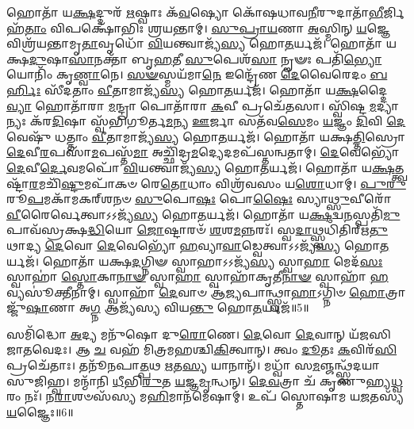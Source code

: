 𑌹𑍋𑌤𑌾᳴ 𑌯\-\ul{𑌕𑍍𑌷}\-𑌦𑍍𑌦𑍁𑌰᳴ \ul{𑌋}\-𑌷𑍍𑌵𑌾𑌃 𑌕᳴\-\ul{𑌵}\-𑌷𑍍𑌯𑍋 𑌕𑍋᳴𑌷𑌧𑌾𑌵\-\ul{𑌨𑍀}\-𑌰𑍁𑌦𑌾𑌤𑌾᳴\-\ul{𑌭𑍀}\-𑌰𑍍𑌜𑌿𑌹᳴\-\ul{𑌤𑌾𑌂} 𑌵𑌿𑌪𑌕𑍍𑌷𑍋᳴𑌭𑌿𑌃 𑌶𑍍𑌰𑌯𑌨𑍍𑌤𑌾𑌮𑍍।
\-\ul{𑌸𑍁}\-\-\ul{𑌪𑍍𑌰𑌾}\-\-\ul{𑌯}\-𑌣𑌾 \ul{𑌅}\-𑌸𑍍𑌮𑌿𑌨𑍍 \ul{𑌯}\-𑌜𑍍𑌞𑍇 𑌵𑌿𑌶𑍍𑌰᳴𑌯𑌨𑍍𑌤𑌾𑌮𑍃\-\ul{𑌤𑌾}\-𑌵𑍃𑌧𑍋᳴ \ul{𑌵𑌿}\-𑌯𑌨𑍍𑌤𑍍𑌵𑌾𑌜𑍍𑌯᳴\-\ul{𑌸𑍍𑌯} 𑌹𑍋\-\ul{𑌤}\-𑌰𑍍𑌯𑌜᳴।
𑌹𑍋𑌤𑌾᳴ 𑌯𑌕𑍍𑌷\-\ul{𑌦𑍁}\-𑌷𑌾\-\ul{𑌸𑌾}\-𑌨𑌕𑍍𑌤𑌾᳴ 𑌬𑍃\-\ul{𑌹}\-𑌤𑍀 \ul{𑌸𑍁}\-𑌪𑍇𑌶᳴\-\ul{𑌸𑌾} 𑌨𑍄𑍟𑌃 𑌪𑌤𑌿᳴\-\ul{𑌭𑍍𑌯𑍋} 𑌯𑍋𑌨𑌿𑌂᳴ 𑌕𑍃\-\ul{𑌣𑍍𑌵𑌾}\-𑌨𑍇।
\-\ul{𑌸}\-\-\ul{𑍟}\-𑌸𑍍𑌮𑌯᳴𑌮𑌾\-\ul{𑌨𑍇} 𑌇𑌨𑍍𑌦𑍍𑌰𑍇᳴𑌣 \ul{𑌦𑍇}\-𑌵𑍈𑌰𑍇𑌦𑌂 \ul{𑌬}\-\-\ul{𑌰𑍍}\-𑌹𑌿𑌃 𑌸𑍀᳴𑌦𑌤𑌾𑌂 \ul{𑌵𑍀}\-𑌤𑌾𑌮𑌾𑌜𑍍𑌯᳴\-\ul{𑌸𑍍𑌯} 𑌹𑍋\-\ul{𑌤}\-𑌰𑍍𑌯𑌜᳴।
𑌹𑍋𑌤𑌾᳴ 𑌯\-\ul{𑌕𑍍𑌷}\-𑌦𑍍𑌦𑍈\-\ul{𑌵𑍍𑌯𑌾} 𑌹𑍋𑌤𑌾᳴𑌰𑌾 \ul{𑌮}\-𑌨𑍍𑌦𑍍𑌰𑌾 𑌪𑍋𑌤𑌾᳴𑌰𑌾 \ul{𑌕}\-𑌵𑍀 𑌪𑍍𑌰𑌚𑍇᳴𑌤𑌸𑌾।
𑌸𑍍𑌵𑌿᳴𑌷𑍍𑌟\-\ul{𑌮}\-𑌦𑍍𑌯𑌾𑌨𑍍𑌯𑌃 𑌕᳴𑌰\-\ul{𑌦𑌿}\-𑌷𑌾 𑌸𑍍𑌵᳴𑌭𑌿𑌗𑍂𑌰𑍍𑌤\-\ul{𑌮}\-𑌨𑍍𑌯 \ul{𑌊}\-𑌰𑍍𑌜𑌾 𑌸𑌤᳴𑌵\-\ul{𑌸𑍇}\-𑌮𑌂 \ul{𑌯}\-𑌜𑍍𑌞𑌂 \ul{𑌦𑌿}\-𑌵𑌿 \ul{𑌦𑍇}\-𑌵𑍇𑌷𑍁᳴ 𑌧𑌤𑍍𑌤𑌾𑌂 \ul{𑌵𑍀}\-𑌤𑌾𑌮𑌾𑌜𑍍𑌯᳴\-\ul{𑌸𑍍𑌯} 𑌹𑍋\-\ul{𑌤}\-𑌰𑍍𑌯𑌜᳴।
𑌹𑍋𑌤𑌾᳴ 𑌯𑌕𑍍𑌷\-\ul{𑌤𑍍𑌤𑌿}\-𑌸𑍍𑌰𑍋 \ul{𑌦𑍇}\-𑌵𑍀\-\ul{𑌰}\-𑌪𑌸𑌾᳴\-\ul{𑌮}\-𑌪𑌸𑍍𑌤᳴\-\ul{𑌮𑌾} 𑌅𑌚𑍍𑌛𑌿᳴𑌦𑍍𑌰\-\ul{𑌮}\-𑌦𑍍𑌯𑍇𑌦𑌮𑌪᳴𑌸𑍍𑌤𑌨𑍍𑌵𑌤𑌾𑌮𑍍।
\-\ul{𑌦𑍇}\-𑌵𑍇𑌭𑍍𑌯𑍋᳴ \ul{𑌦𑍇}\-𑌵𑍀\-\ul{𑌰𑍍𑌦𑍇}\-𑌵𑌮𑌪𑍋᳴ \ul{𑌵𑌿}\-𑌯𑌨𑍍𑌤𑍍𑌵𑌾𑌜𑍍𑌯᳴\-\ul{𑌸𑍍𑌯} 𑌹𑍋\-\ul{𑌤}\-𑌰𑍍𑌯𑌜᳴।
𑌹𑍋𑌤𑌾᳴ 𑌯\-\ul{𑌕𑍍𑌷}\-𑌤𑍍𑌤𑍍𑌵𑌷𑍍𑌟𑌾᳴\-\ul{𑌰}\-𑌮𑌚𑌿᳴\-\ul{𑌷𑍍𑌟𑍁}\-𑌮𑌪𑌾᳴𑌕𑍞 𑌰𑍇\-\ul{𑌤𑍋}\-𑌧𑌾𑌂 𑌵𑌿𑌶𑍍𑌰᳴𑌵𑌸𑌂 𑌯\-\ul{𑌶𑍋}\-𑌧𑌾𑌮𑍍।
\-\ul{𑌪𑍁}\-\-\ul{𑌰𑍁}\-𑌰𑍂\-\ul{𑌪}\-𑌮𑌕𑌾᳴𑌮𑌕𑌰𑍍‌\mbox{}𑌶𑌨𑍞 \ul{𑌸𑍁}\-𑌪𑍋\-\ul{𑌷𑌃} 𑌪𑍋\-\ul{𑌷𑍈𑌃} 𑌸𑍍𑌯𑌾\-\ul{𑌥𑍍𑌸𑍁}\-𑌵𑍀𑌰𑍋᳴ \ul{𑌵𑍀}\-𑌰𑍈𑌰𑍍𑌵𑍇𑌤𑍍𑌵𑌾𑌽𑌽𑌜𑍍𑌯᳴\-\ul{𑌸𑍍𑌯} 𑌹𑍋\-\ul{𑌤}\-𑌰𑍍𑌯𑌜᳴।
𑌹𑍋𑌤𑌾᳴ 𑌯\-\ul{𑌕𑍍𑌷}\-𑌦𑍍𑌵\-\ul{𑌨}\-𑌸𑍍𑌪𑌤𑌿᳴\-\ul{𑌮𑍁}\-𑌪𑌾𑌵᳴𑌸𑍍𑌰𑌕𑍍𑌷\-\ul{𑌦𑍍𑌧𑌿}\-𑌯𑍋 \ul{𑌜𑍋}\-𑌷𑍍𑌟𑌾𑌰𑍞᳴ \ul{𑌶}\-𑌶\-\ul{𑌮}\-𑌨𑍍𑌨𑌰𑌃᳴।
𑌸𑍍𑌵\-\ul{𑌦𑌾}\-𑌥𑍍𑌸𑍍𑌵𑌧𑌿᳴𑌤𑌿𑌰𑍍\mbox{}𑌋\-\ul{𑌤𑍁}\-𑌥𑌾𑌦𑍍𑌯 \ul{𑌦𑍇}\-𑌵𑍋 \ul{𑌦𑍇}\-𑌵𑍇𑌭𑍍𑌯𑍋᳴ \ul{𑌹}\-𑌵𑍍𑌯𑌾\-\ul{𑌵𑌾}\-𑌡𑍍𑌵𑍇𑌤𑍍𑌵𑌾𑌽𑌽𑌜𑍍𑌯᳴\-\ul{𑌸𑍍𑌯} 𑌹𑍋\-\ul{𑌤}\-𑌰𑍍𑌯𑌜᳴।
𑌹𑍋𑌤𑌾᳴ 𑌯𑌕𑍍𑌷\-\ul{𑌦}\-𑌗𑍍𑌨𑌿𑍟 𑌸𑍍𑌵𑌾𑌹𑌾\-𑌽𑌽𑌜𑍍𑌯᳴\-\ul{𑌸𑍍𑌯} 𑌸𑍍𑌵𑌾\-\ul{𑌹𑌾} 𑌮𑍇𑌦᳴\-\ul{𑌸𑌃} 𑌸𑍍𑌵𑌾𑌹𑌾॑ \ul{𑌸𑍍𑌤𑍋}\-𑌕𑌾\-\ul{𑌨𑌾}\-\-\ul{𑍟} 𑌸𑍍𑌵𑌾\-\ul{𑌹𑌾} 𑌸𑍍𑌵𑌾𑌹𑌾᳴𑌕𑍃𑌤𑍀\-\ul{𑌨𑌾}\-\-\ul{𑍟} 𑌸𑍍𑌵𑌾𑌹𑌾᳴ \ul{𑌹}\-𑌵𑍍𑌯𑌸𑍂॑𑌕𑍍𑌤𑍀𑌨𑌾𑌮𑍍।
𑌸𑍍𑌵𑌾𑌹𑌾᳴ \ul{𑌦𑍇}\-𑌵𑌾𑍞 𑌆॑\-\ul{𑌜𑍍𑌯}\-𑌪𑌾𑌨𑍍𑌥𑍍𑌸𑍍𑌵𑌾\-\ul{𑌹𑌾}\-\-𑌽𑌗𑍍𑌨𑌿𑍞 \ul{𑌹𑍋}\-𑌤𑍍𑌰𑌾𑌜𑍍𑌜𑍁᳴\-\ul{𑌷𑌾}\-𑌣𑌾 𑌅\-\ul{𑌗𑍍𑌨} 𑌆𑌜𑍍𑌯᳴𑌸𑍍𑌯 𑌵𑌿𑌯\-\ul{𑌨𑍍𑌤𑍁} 𑌹𑍋\-\ul{𑌤}\-𑌰𑍍𑌯𑌜᳴॥5॥

𑌸𑌮𑌿᳴𑌦𑍍𑌧𑍋 \ul{𑌅}\-𑌦𑍍𑌯 𑌮𑌨𑍁᳴𑌷𑍋 𑌦𑍁\-\ul{𑌰𑍋}\-𑌣𑍇।
\-\ul{𑌦𑍇}\-𑌵𑍋 \ul{𑌦𑍇}\-𑌵𑌾𑌨𑍍 𑌯᳴𑌜𑌸𑌿 𑌜𑌾𑌤𑌵𑍇𑌦𑌃।
𑌆 \ul{𑌚} 𑌵𑌹᳴ 𑌮𑌿𑌤𑍍𑌰𑌮𑌹𑌶𑍍𑌚𑌿\-\ul{𑌕𑌿}\-𑌤𑍍𑌵𑌾𑌨𑍍।
𑌤𑍍𑌵𑌂 \ul{𑌦𑍂}\-𑌤𑌃 \ul{𑌕}\-𑌵𑌿𑌰᳴\-\ul{𑌸𑌿} 𑌪𑍍𑌰𑌚𑍇᳴𑌤𑌾𑌃।
𑌤𑌨𑍂᳴𑌨𑌪𑌾\-\ul{𑌤𑍍𑌪}\-𑌥 \ul{𑌋}\-𑌤\-\ul{𑌸𑍍𑌯} 𑌯𑌾𑌨𑌾𑌨𑍍᳴।
𑌮𑌧𑍍𑌵𑌾᳴ 𑌸\-\ul{𑌮}\-𑌞𑍍𑌜𑌨𑍍𑌥𑍍𑌸𑍍𑌵᳴𑌦𑌯𑌾 𑌸𑍁𑌜𑌿𑌹𑍍𑌵।
𑌮𑌨𑍍𑌮𑌾᳴𑌨𑌿 \ul{𑌧𑍀}\-𑌭𑌿\-\ul{𑌰𑍁}\-𑌤 \ul{𑌯}\-𑌜𑍍𑌞\-\ul{𑌮𑍃}\-𑌨𑍍𑌧𑌨𑍍।
\-\ul{𑌦𑍇}\-\-\ul{𑌵}\-𑌤𑍍𑌰𑌾 𑌚᳴ 𑌕𑍃𑌣𑍁𑌹𑍍𑌯\-\ul{𑌧𑍍𑌵}\-𑌰𑌂 𑌨𑌃᳴।
𑌨\-\ul{𑌰𑌾}\-𑌶𑍞𑌸᳴𑌸𑍍𑌯 𑌮\-\ul{𑌹𑌿}\-𑌮𑌾𑌨᳴𑌮𑍇𑌷𑌾𑌮𑍍।
𑌉𑌪᳴ 𑌸𑍍𑌤𑍋𑌷𑌾𑌮 𑌯\-\ul{𑌜}\-𑌤𑌸𑍍𑌯᳴ \ul{𑌯}\-𑌜𑍍𑌞𑍈𑌃॥6॥

